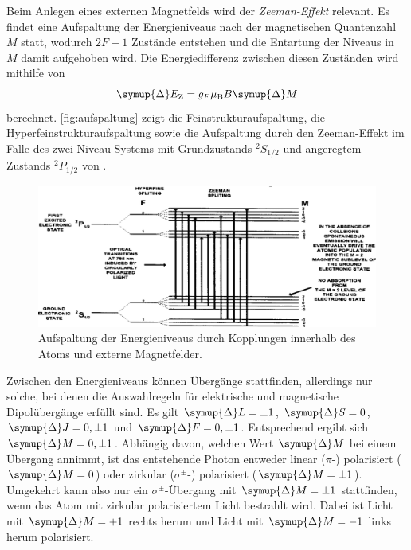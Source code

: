     Beim Anlegen eines externen Magnetfelds wird der \textit{Zeeman-Effekt} relevant.
    Es findet eine Aufspaltung der Energieniveaus nach der magnetischen Quantenzahl $M$ statt,
    wodurch $2F+1$ Zustände entstehen und die Entartung der Niveaus in $M$ damit aufgehoben wird.
    Die Energiedifferenz zwischen diesen Zuständen wird mithilfe von
    \begin{equation}
        \symup{\Delta} E_\text{Z} = g_F \mu_\text{B} B \symup{\Delta} M
        \label{eqn:zeemanaufspaltung}
    \end{equation}
    berechnet.
    \autoref{fig:aufspaltung} zeigt die Feinstrukturaufspaltung,
    die Hyperfeinstrukturaufspaltung sowie die Aufspaltung durch den Zeeman-Effekt im Falle des zwei-Niveau-Systems mit Grundzustands $^2S_{1/2}$ und angeregtem Zustands $^2P_{1/2}$ von .
    \begin{figure}[H]
        \centering
        \includegraphics[width=\textwidth]{content/img/Lit2_Abb_2D-3.png}
        \caption{Aufspaltung der Energieniveaus durch Kopplungen innerhalb des Atoms und externe Magnetfelder. \cite{caltech}}
        \label{fig:aufspaltung}
    \end{figure}
    Zwischen den Energieniveaus können Übergänge stattfinden,
    allerdings nur solche,
    bei denen die Auswahlregeln für elektrische und magnetische Dipolübergänge erfüllt sind.
    Es gilt $\symup{\Delta} L = \pm 1$, $\symup{\Delta} S = 0$, $\symup{\Delta} J = 0, \pm 1$ und $\symup{\Delta} F = 0, \pm 1$.
    Entsprechend ergibt sich $\symup{\Delta} M = 0, \pm 1$.
    Abhängig davon,
    welchen Wert $\symup{\Delta} M$ bei einem Übergang annimmt,
    ist das entstehende Photon entweder linear ($\pi$-) polarisiert ($\symup{\Delta}M = 0$) oder zirkular ($\sigma^{\pm}$-) polarisiert ($\symup{\Delta}M = \pm 1$).
    Umgekehrt kann also nur ein $\sigma^{\pm}$-Übergang mit $\symup{\Delta} M = \pm 1$ stattfinden,
    wenn das Atom mit zirkular polarisiertem Licht bestrahlt wird.
    Dabei ist Licht mit $\symup{\Delta} M = +1$ rechts herum und Licht mit $\symup{\Delta} M = -1$ links herum polarisiert.

